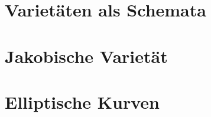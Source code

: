 
\usepackage[ngerman]{babel}

\usepackage[backend=biber]{biblatex}




\section{Varietäten als Schemata}

\section{Jakobische Varietät}

\section{Elliptische Kurven}


